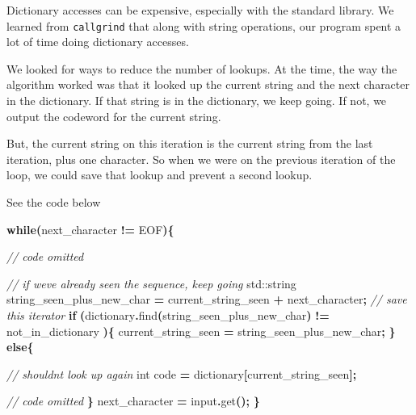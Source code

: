 \documentclass[12pt,twoside]{reedthesis}
\newenvironment{Shaded}{\begin{snugshade}}{\end{snugshade}}
\newcommand{\BuiltInTok}[1]{#1}
\newcommand{\CommentTok}[1]{\textcolor[rgb]{0.56,0.35,0.01}{\textit{#1}}}
\newcommand{\ControlFlowTok}[1]{\textcolor[rgb]{0.13,0.29,0.53}{\textbf{#1}}}
\newcommand{\DataTypeTok}[1]{\textcolor[rgb]{0.13,0.29,0.53}{#1}}
\newcommand{\NormalTok}[1]{#1}
\newcommand{\OperatorTok}[1]{\textcolor[rgb]{0.81,0.36,0.00}{\textbf{#1}}}
\begin{document}
Dictionary accesses can be expensive, especially with the standard library. We learned from \texttt{callgrind} that along with string operations, our program spent a lot of time doing dictionary accesses.

We looked for ways to reduce the number of lookups. At the time, the way the algorithm worked was that it looked up the current string and the next character in the dictionary. If that string is in the dictionary, we keep going. If not, we output the codeword for the current string.

But, the current string on this iteration is the current string from the last iteration, plus one character. So when we were on the previous iteration of the loop, we could save that lookup and prevent a second lookup.

See the code below
\begin{Shaded}
\begin{Highlighting}[]
    \ControlFlowTok{while}\OperatorTok{(}\NormalTok{next\_character }\OperatorTok{!=}\NormalTok{ EOF}\OperatorTok{)\{}

        \CommentTok{// code omitted}


        \CommentTok{// if we\textquotesingle{}ve already seen the sequence, keep going}
        \BuiltInTok{std::}\NormalTok{string}\OperatorTok{ }\NormalTok{string\_seen\_plus\_new\_char }\OperatorTok{=}\NormalTok{ current\_string\_seen }\OperatorTok{+}\NormalTok{ next\_character}\OperatorTok{;}
        \CommentTok{// save this iterator\textasciigrave{}}
        \ControlFlowTok{if} \OperatorTok{(}\NormalTok{dictionary}\OperatorTok{.}\NormalTok{find}\OperatorTok{(}\NormalTok{string\_seen\_plus\_new\_char}\OperatorTok{)} \OperatorTok{!=}\NormalTok{ not\_in\_dictionary }\OperatorTok{)\{}
\NormalTok{            current\_string\_seen }\OperatorTok{=}\NormalTok{ string\_seen\_plus\_new\_char}\OperatorTok{;}
        \OperatorTok{\}}
        \ControlFlowTok{else}\OperatorTok{\{}

            \CommentTok{// shouldn\textquotesingle{}t look up again}
            \DataTypeTok{int}\NormalTok{ code }\OperatorTok{=}\NormalTok{ dictionary}\OperatorTok{[}\NormalTok{current\_string\_seen}\OperatorTok{];}


            \CommentTok{// code omitted}
        \OperatorTok{\}}
\NormalTok{        next\_character }\OperatorTok{=}\NormalTok{ input}\OperatorTok{.}\NormalTok{get}\OperatorTok{();}
    \OperatorTok{\}}
\end{Highlighting}
\end{Shaded}
\end{document}
